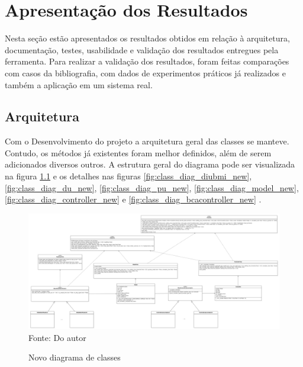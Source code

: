 \chapter{Apresentação dos Resultados}

Nesta seção estão apresentados os resultados obtidos em relação à arquitetura, documentação, testes, usabilidade e
validação dos resultados entregues pela ferramenta.
Para realizar a validação dos resultados, foram feitas comparações com casos da bibliografia, com dados de experimentos
práticos já realizados e também a aplicação em um sistema real.


\section{Arquitetura}
Com o Desenvolvimento do projeto a arquitetura geral das classes se manteve.
Contudo, os métodos já existentes foram melhor definidos, além de serem adicionados diversos outros.
A estrutura geral do diagrama pode ser visualizada na figura \ref{fig:class_diag_new} e os detalhes nas figuras
\ref{fig:class_diag_diubmi_new}, \ref{fig:class_diag_du_new}, \ref{fig:class_diag_pu_new},
\ref{fig:class_diag_model_new}, \ref{fig:class_diag_controller_new} e \ref{fig:class_diag_bcacontroller_new} .

\begin{figure}[H]
    \centering
    \caption{Novo diagrama de classes}
    \includegraphics[scale=0.17]{figuras/class_diag_new}
    \label{fig:class_diag_new}
    \\
    \vspace{0cm}\hspace{0cm}\small{Fonte: Do autor}
\end{figure}

